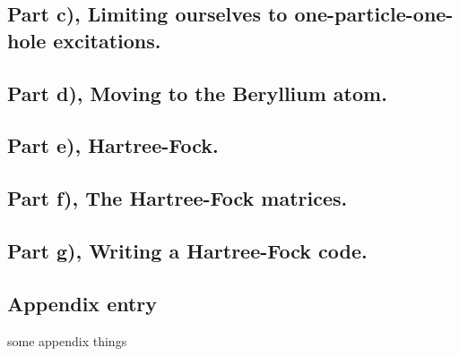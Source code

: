 \documentclass{article}
\begin{document}
\subsection*{Part c), Limiting ourselves to one-particle-one-hole excitations.}
\subsection*{Part d), Moving to the Beryllium atom.}
\subsection*{Part e), Hartree-Fock.}
\subsection*{Part f), The Hartree-Fock matrices.}
\subsection*{Part g), Writing a Hartree-Fock code.}


\begin{appendix}
    \section{Appendix entry}
    some appendix things
\end{appendix}
\cite{DFTgap}
\printbibliography
\end{document}
